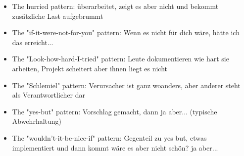 \documentclass[paper=a4, fontsize=11pt]{scrartcl} %
\numberwithin{equation}{section} %
\numberwithin{figure}{section} %
\numberwithin{table}{section} %
\begin{document}
\begin{itemize}
\begin{itemize}
    \item The hurried pattern: überarbeitet, zeigt es aber nicht und bekommt zusätzliche Last aufgebrummt
    \item The "if-it-were-not-for-you" pattern: Wenn es nicht für dich wäre, hätte ich das erreicht...
    \item The "Look-how-hard-I-tried" pattern: Leute dokumentieren wie hart sie arbeiten, Projekt scheitert aber ihnen liegt es nicht
    \item The "Schlemiel" pattern: Verursacher ist ganz woanders, aber anderer steht als Verantwortlicher dar
    \item The "yes-but" pattern: Vorschlag gemacht, dann ja aber... (typische Abwehrhaltung)
    \item The "wouldn't-it-be-nice-if" pattern: Gegenteil zu yes but, etwas implementiert und dann kommt wäre es aber nicht schön? ja aber...
  \end{itemize}
\end{itemize}
\end{document}
